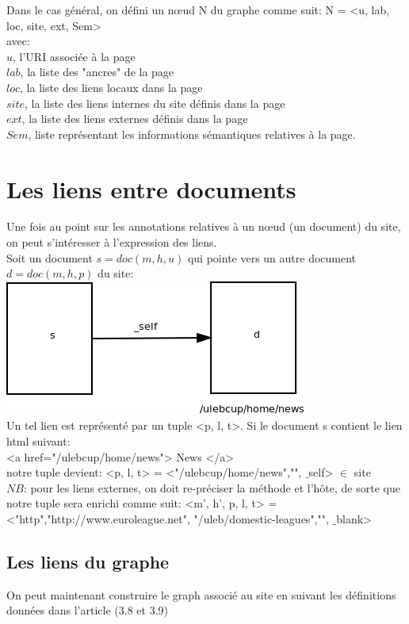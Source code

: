 \documentclass[a4paper]{report}
\begin{document}
Dans le cas général, on défini un nœud N du graphe comme suit: N = <u, lab, loc, site, ext, Sem>\\
 avec:\\
 $u$, l'URI associée à la page\\
 $lab$, la liste des "ancres" de la page\\
 $loc$, la liste des liens locaux dans la page\\
 $site$, la liste des liens internes du site définis dans la page\\
 $ext$, la liste des liens externes définis dans la page\\
 $Sem$, liste représentant les informations sémantiques relatives à la page.\\
 
\section{ Les liens entre documents\\ }
Une fois au point sur les annotations relatives à un nœud (un document) du site, on peut s'intéresser à l'expression des liens.\\
Soit un document $s = doc(m,h,u)$ qui pointe vers un autre document $d = doc(m,h,p)$ du site:\\
\includegraphics[scale=0.6]{lienSimple.png}\\
Un tel lien est représenté par un tuple <p, l, t>. Si le document s contient le lien html suivant:\\
<a href="/ulebcup/home/news"> News </a>\\
notre tuple devient: <p, l, t> = <"/ulebcup/home/news","", $\_$self> $\in$ site\\
$NB$: pour les liens externes, on doit re-préciser la méthode et l’hôte, de sorte que notre tuple sera enrichi comme suit: <m', h', p, l, t> = <"http","http://www.euroleague.net",
"/uleb/domestic-leagues","", $\_$blank>\\
\subsection*{ Les liens du graphe\\ }
On peut maintenant construire le graph associé au site en suivant les définitions données dans l'article (3.8 et 3.9)\\
\end{document}
